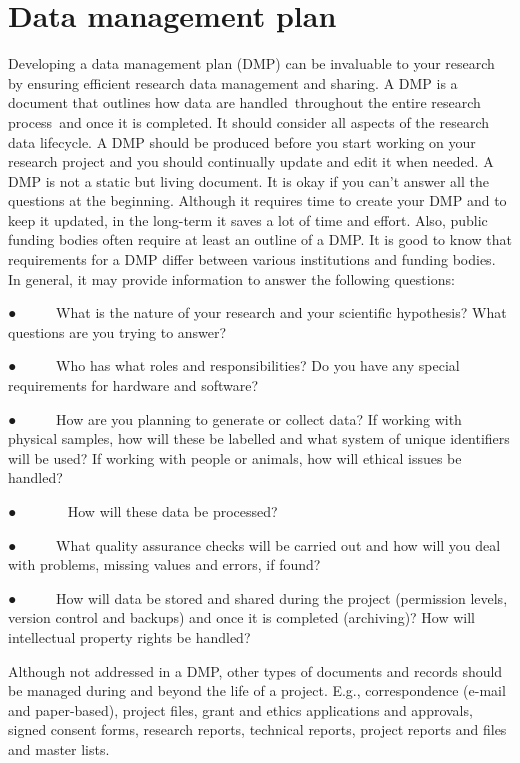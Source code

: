 \documentclass[
]{book}
\begin{document}
\hypertarget{data-management-plan}{%
\section{\texorpdfstring{\textbf{Data management plan}}{Data management plan}}\label{data-management-plan}}

Developing a data management plan (DMP) can be invaluable to your research by ensuring efficient research data management and sharing. A DMP is a document that outlines how data are handled~throughout the entire research process~and once it is completed. It should consider all aspects of the research data lifecycle. A DMP should be produced before you start working on your research project and you should continually update and edit it when needed. A DMP is not a static but living document. It is okay if you can't answer all the questions at the beginning. Although it requires time to create your DMP and to keep it updated, in the long-term it saves a lot of time and effort. Also, public funding bodies often require at least an outline of a DMP. It is good to know that requirements for a DMP differ between various institutions and funding bodies. In general, it may provide information to answer the following questions:

● ~ ~ ~ What is the nature of your research and your scientific hypothesis? What questions are you trying to answer?

● ~ ~ ~ Who has what roles and responsibilities? Do you have any special requirements for hardware and software?

● ~ ~ ~ How are you planning to generate or collect data? If working with physical samples, how will these be labelled and what system of unique identifiers will be used? If working with people or animals, how will ethical issues be handled?

● ~ ~ ~ ~ How will these data be processed?

● ~ ~ ~ What quality assurance checks will be carried out and how will you deal with problems, missing values and errors, if found?

● ~ ~ ~ How will data be stored and shared during the project (permission levels, version control and backups) and once it is completed (archiving)? How will intellectual property rights be handled?

Although not addressed in a DMP, other types of documents and records should be managed during and beyond the life of a project. E.g., correspondence (e-mail and paper-based), project files, grant and ethics applications and approvals, signed consent forms, research reports, technical reports, project reports and files and master lists.
\end{document}
